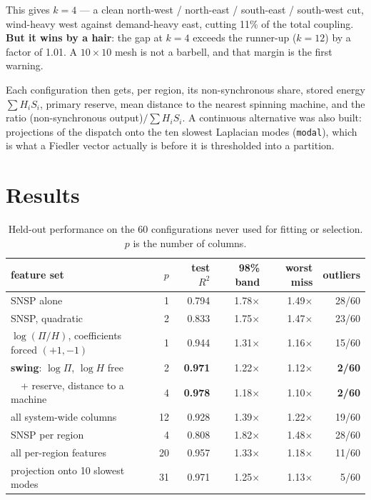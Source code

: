 \documentclass[11pt,a4paper]{article}
\newcommand{\Rtwo}{\ensuremath{R^{2}}}
\begin{document}
This gives $k=4$ --- a clean north-west / north-east / south-east / south-west
cut, wind-heavy west against demand-heavy east, cutting 11\% of the total
coupling. \textbf{But it wins by a hair}: the gap at $k=4$ exceeds the
runner-up ($k=12$) by a factor of 1.01. A $10\times10$ mesh is not a
barbell, and that margin is the first warning.

Each configuration then gets, per region, its non-synchronous share, stored
energy $\sum H_i S_i$, primary reserve, mean distance to the nearest spinning
machine, and the ratio (non-synchronous output)$/\sum H_i S_i$. A continuous
alternative was also built: projections of the dispatch onto the ten slowest
Laplacian modes (\texttt{modal}), which is what a Fiedler vector actually is
before it is thresholded into a partition.

\section{Results}

\begin{table}[h]
\centering
\small
\caption{Held-out performance on the 60 configurations never used for
fitting or selection. $p$ is the number of columns.}
\begin{tabular}{lrrrrr}
\toprule
feature set & $p$ & test \Rtwo & 98\% band & worst miss & outliers \\
\midrule
SNSP alone                                    & 1  & 0.794 & 1.78$\times$ & 1.49$\times$ & 28/60 \\
SNSP, quadratic                               & 2  & 0.833 & 1.75$\times$ & 1.47$\times$ & 23/60 \\
\midrule
\rowcolor{gray!12}
$\log(\Pi/H)$, coefficients forced $(+1,-1)$  & 1  & 0.944 & 1.31$\times$ & 1.16$\times$ & 15/60 \\
\rowcolor{gray!12}
\textbf{swing}: $\log \Pi$, $\log H$ free     & 2  & \textbf{0.971} & 1.22$\times$ & 1.12$\times$ & \textbf{2/60} \\
\rowcolor{gray!12}
\ \ + reserve, distance to a machine          & 4  & \textbf{0.978} & 1.18$\times$ & 1.10$\times$ & \textbf{2/60} \\
\midrule
all system-wide columns                       & 12 & 0.928 & 1.39$\times$ & 1.22$\times$ & 19/60 \\
SNSP per region                               & 4  & 0.808 & 1.82$\times$ & 1.48$\times$ & 28/60 \\
all per-region features                       & 20 & 0.957 & 1.33$\times$ & 1.18$\times$ & 11/60 \\
projection onto 10 slowest modes              & 31 & 0.971 & 1.25$\times$ & 1.13$\times$ & 5/60 \\
\bottomrule
\end{tabular}
\label{tab:main}
\end{table}
\end{document}
